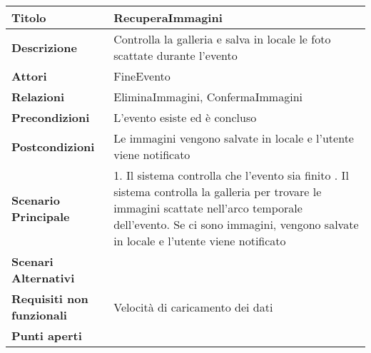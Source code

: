 \begin{tabular} {|P{4.5cm}|P{12.5cm}|}
  \hline
  \textbf{Titolo}                   & RecuperaImmagini                                                          \\
  \hline
  \textbf{Descrizione}              & Controlla la galleria e salva in locale le foto scattate durante l'evento \\
  \hline
  \textbf{Attori}                   & FineEvento                                                                \\
  \hline
  \textbf{Relazioni}                & EliminaImmagini, ConfermaImmagini                                         \\
  \hline
  \textbf{Precondizioni}            & L'evento esiste ed è concluso                                             \\
  \hline
  \textbf{Postcondizioni}           & Le immagini vengono salvate in locale e l'utente viene notificato         \\
  \hline
  \textbf{Scenario Principale}      & 1. Il sistema controlla che l'evento sia finito . Il sistema controlla la galleria per trovare le immagini scattate nell'arco temporale dell'evento. Se ci sono immagini, vengono salvate in locale e l'utente viene notificato                                 \\
  \textbf{Scenari Alternativi}      &                                                                           \\
  \hline
  \textbf{Requisiti non funzionali} & Velocità di caricamento dei dati                                          \\
  \hline
  \textbf{Punti aperti}             &                                                                           \\
  \hline
\end{tabular}
\hfill
\break

